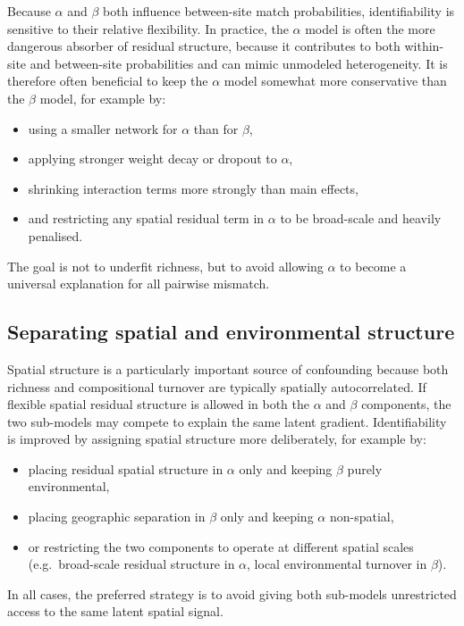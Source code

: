 \documentclass{article}
\begin{document}
Because \(\alpha\) and \(\beta\) both influence between-site match probabilities, identifiability is sensitive to their relative flexibility. In practice, the \(\alpha\) model is often the more dangerous absorber of residual structure, because it contributes to both within-site and between-site probabilities and can mimic unmodeled heterogeneity. It is therefore often beneficial to keep the \(\alpha\) model somewhat more conservative than the \(\beta\) model, for example by:
\begin{itemize}
    \item using a smaller network for \(\alpha\) than for \(\beta\),
    \item applying stronger weight decay or dropout to \(\alpha\),
    \item shrinking interaction terms more strongly than main effects,
    \item and restricting any spatial residual term in \(\alpha\) to be broad-scale and heavily penalised.
\end{itemize}
The goal is not to underfit richness, but to avoid allowing \(\alpha\) to become a universal explanation for all pairwise mismatch.

\subsection{Separating spatial and environmental structure}

Spatial structure is a particularly important source of confounding because both richness and compositional turnover are typically spatially autocorrelated. If flexible spatial residual structure is allowed in both the \(\alpha\) and \(\beta\) components, the two sub-models may compete to explain the same latent gradient. Identifiability is improved by assigning spatial structure more deliberately, for example by:
\begin{itemize}
    \item placing residual spatial structure in \(\alpha\) only and keeping \(\beta\) purely environmental,
    \item placing geographic separation in \(\beta\) only and keeping \(\alpha\) non-spatial,
    \item or restricting the two components to operate at different spatial scales (e.g.\ broad-scale residual structure in \(\alpha\), local environmental turnover in \(\beta\)).
\end{itemize}
In all cases, the preferred strategy is to avoid giving both sub-models unrestricted access to the same latent spatial signal.
\end{document}
